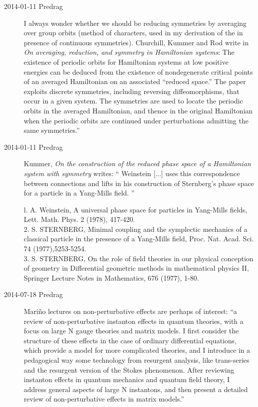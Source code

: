 \begin{description}
\item[2014-01-11 Predrag]
I always wonder whether we should be reducing symmetries
by averaging over group orbits (method of characters, used in
my derivation of the {\Fd} in presence of continuous symmetries).
Churchill, Kummer and Rod write in
{\em On averaging, reduction, and symmetry in {Hamiltonian} systems}:
The existence of periodic orbits for Hamiltonian systems at
low positive energies can be deduced from the existence of nondegenerate
critical points of an averaged Hamiltonian on an associated ``reduced
space.'' The paper exploits discrete symmetries, including reversing
diffeomorphisms, that occur in a given system. The symmetries are used to
locate the periodic orbits in the averaged Hamiltonian, and thence in the
original Hamiltonian when the periodic orbits are continued under
perturbations admitting the same symmetries.''

\item[2014-01-11 Predrag]
Kummer, {\em On the construction of the reduced phase space
of a {Hamiltonian} system with symmetry} writes:
``
Weinstein [...] uses this correspondence between connections
and lifts in his construction of Sternberg's phase space for a
particle in a Yang-Mills field.
''

l. A. Weinstein, A universal phase space for particles in Yang-Mills
fields, Lett. Math. Phys. 2 (1978), 417-420. \\
2. S. STERNBERG, Minimal coupling and the symplectic mechanics of a
classical particle in the presence of a Yang-Mills field, Proc. Nat.
Acad. Sci. 74 (1977),5253-5254. \\
3. S. STERNBERG, On the role of field theories in our physical conception
of geometry in Differential geometric methods in mathematical physics II,
Springer Lecture Notes in Mathematics,
676 (1977), 1-80. \\

\item[2014-07-18 Predrag]
Mari\~no lectures on non-perturbative effects are perhaps of
interest:
 ``a review of non-perturbative
instanton effects in quantum theories, with a focus on large N gauge
theories and matrix models. I first consider the structure of these
effects in the case of ordinary differential equations, which provide a
model for more complicated theories, and I introduce in a pedagogical way
some technology from resurgent analysis, like trans-series and the
resurgent version of the Stokes phenomenon. After reviewing instanton
effects in quantum mechanics and quantum field theory, I address general
aspects of large N instantons, and then present a detailed review of
non-perturbative effects in matrix models.''


\end{description}
